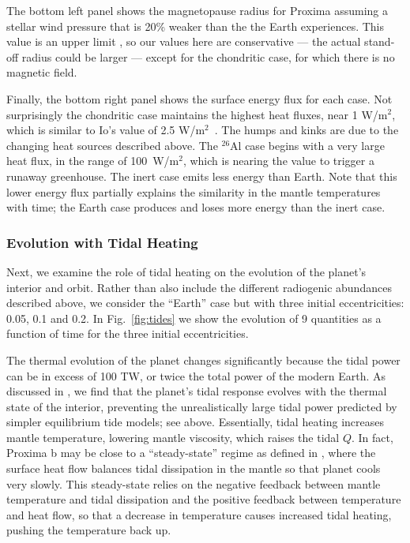 \documentclass[preprint,12pt]{aastex}
\begin{document}
The bottom left panel shows the magnetopause radius for Proxima
assuming a stellar wind pressure that is 20\% weaker than the 
the Earth experiences. 
This value
is an upper limit \citep{Wood01}, so our values here are conservative
--- the actual stand-off radius could be larger --- except for the
chondritic case,
for which there is no magnetic field.

Finally, the bottom right panel shows the surface energy flux for each
case. Not surprisingly the chondritic case maintains the highest heat
fluxes, near 1 W/m$^2$, which is similar to Io's value of 2.5
W/m$^2$~\citep{Veeder94}. The humps and kinks are due to the changing
heat sources described above. The $^{26}$Al case begins with a very
large heat flux, in the range of 100~W/m$^2$, which is nearing the
value to trigger a runaway greenhouse. The inert case emits less
energy than Earth. Note that this lower energy flux partially explains
the similarity in the mantle temperatures with time; the Earth case
produces and loses more energy than the inert case.

\subsubsection{Evolution with Tidal Heating}
\label{sec:results:internal:tides}

Next, we examine the role of tidal heating on the evolution of the planet's interior
and orbit. Rather than also include the different radiogenic
abundances described above, we consider the ``Earth'' case but with
three initial eccentricities: 0.05, 0.1 and 0.2. In
Fig.~\ref{fig:tides} we show the evolution of 9 quantities as a
function of time for the three initial eccentricities.

The thermal evolution of the planet changes significantly
because the tidal power can be in excess of 100 TW, or twice the total
power of the modern Earth. As discussed in \cite{DriscollBarnes15}, we find
that the planet's tidal  
response evolves with the thermal state of the
interior, preventing the unrealistically large tidal power predicted by
simpler equilibrium tide models;
 see above. Essentially, tidal heating 
increases mantle temperature,
lowering mantle viscosity,
which raises the tidal $Q$. In fact, Proxima b
may be close to a
 ``steady-state'' regime as defined in
\cite{DriscollBarnes15},
where the surface heat flow balances tidal dissipation in the mantle so that
planet cools very slowly.  This steady-state relies on the negative feedback between mantle 
temperature and tidal dissipation and the positive feedback between temperature and heat flow, 
so that a decrease in temperature causes increased tidal heating, pushing the temperature back up.
\end{document}
